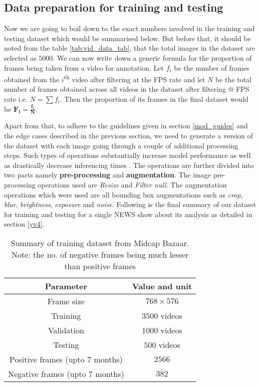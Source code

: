 \subsection{Data preparation for training and testing} \label{train_test}
Now we are going to boil down to the exact numbers involved in the training and testing dataset which would be summarised below. But before that, it should be noted from the table \ref{tab:vid_data_tab}, that the total images in the dataset are selected as $5000$. We can now write down a generic formula for the proportion of frames being taken from a video for annotation. Let $f_i$ be the number of frames obtained from the $i$\textsuperscript{th} video after filtering at the FPS rate and let $N$ be the total number of frames obtained across all videos in the dataset after filtering @ FPS rate i.e. $N = \sum f_{i}$. Then the proportion of its frames in the final dataset would be $\boldsymbol{F_{i} = \frac{f_{i}}{N}}$. \par

Apart from that, to adhere to the guidelines given in section \ref{mod_guides} and the edge cases described in the previous section, we need to generate a version of the dataset with each image going through a couple of additional processing steps. Such types of operations substantially increase model performance as well as drastically decrease inferencing times \cite{Joseph2021} \cite{Dwyer2020}. The operations are further divided into two parts namely \textbf{pre-processing} and \textbf{augmentation}.  The image pre-processing operations used are \textit{Resize} and \textit{Filter null}. The augmentation operations which were used are all bounding box augmentations such as \textit{crop}, \textit{blur}, \textit{brightness}, \textit{exposure} and \textit{noise}. Following is the final summary of our dataset for training and testing for a single NEWS show about its analysis as detailed in section \ref{yv4}.

\begin{table}[h]
 \def\arraystretch{1.5}
 \centering
 \caption{Summary of training dataset from Midcap Bazaar. Note: the no. of negative frames being much lesser than positive frames}
 \begin{tabular}{|c|c|}
  \hline
  Parameter & Value and unit \\
  \hline
  Frame size & $768 \times 576$                    \\
  \hline
  Training & $3500$ videos                   \\
  \hline
  Validation & $1000$ videos                 \\
  \hline
  Testing & $500$ videos                   \\
  \hline
  Positive frames (upto $7$ months) & $2566$                   \\
  \hline
  Negative frames (upto $7$ months) & $382$                   \\
  \hline
 \end{tabular}
 \label{tab:vid_train}
\end{table}

